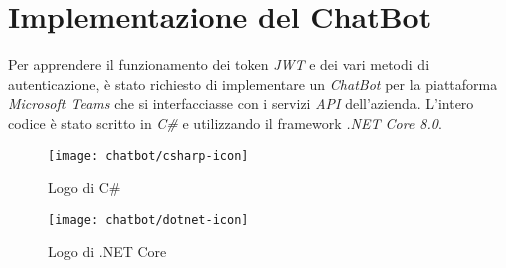 \chapter{Implementazione del ChatBot}
\label{chatbot}

Per apprendere il funzionamento dei token \emph{JWT} e dei vari metodi di autenticazione, è stato richiesto di implementare un \emph{ChatBot} per la piattaforma \emph{Microsoft Teams} che si interfacciasse con i servizi \emph{API} dell'azienda.
L'intero codice è stato scritto in \emph{C\#} e utilizzando il framework \emph{.NET Core 8.0}.

\begin{figure}[!ht]
    \centering
    \begin{minipage}[t]{0.5\textwidth}
        \centering
        \texttt{[image: chatbot/csharp-icon]}
        \caption{Logo di C\#}
    \end{minipage}\hfill
    \begin{minipage}[t]{0.5\textwidth}
        \centering
        \texttt{[image: chatbot/dotnet-icon]}
        \caption{Logo di .NET Core}
    \end{minipage}
\end{figure}

